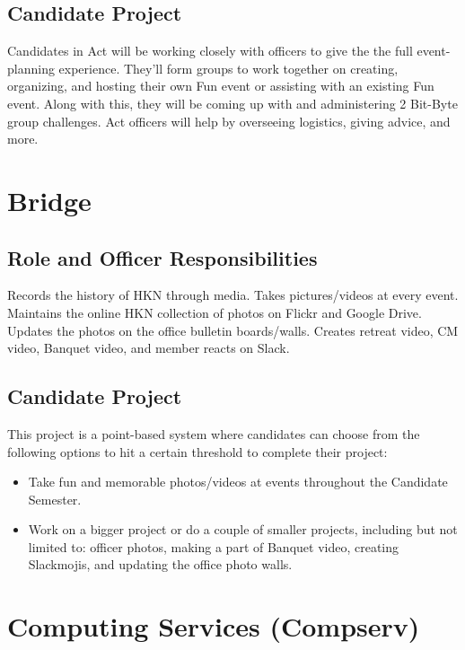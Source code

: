 \documentclass[11pt, article, oneside]{memoir}
\begin{document}
    \subsection{Candidate Project}
        Candidates in Act will be working closely with officers to give the the full event-planning experience.
        They'll form groups to work together on creating, organizing, and hosting their own Fun event or assisting with an existing Fun event.
        Along with this, they will be coming up with and administering 2 Bit-Byte group challenges.
        Act officers will help by overseeing logistics, giving advice, and more.
    
    \section{Bridge}
    \subsection{Role and Officer Responsibilities}
        Records the history of HKN through media.
        Takes pictures/videos at every event.
        Maintains the online HKN collection of photos on Flickr and Google Drive.
        Updates the photos on the office bulletin boards/walls.
        Creates retreat video, CM video, Banquet video, and member reacts on Slack.

    \subsection{Candidate Project}
        This project is a point-based system where candidates can choose from the following options to hit a certain threshold to complete their project:
        \begin{itemize}
            \item Take fun and memorable photos/videos at events throughout the Candidate Semester.
            \item Work on a bigger project or do a couple of smaller projects, including but not limited to: officer photos, making a part of Banquet video, creating Slackmojis, and updating the office photo walls.
        \end{itemize}


    \section{Computing Services (Compserv)}
\end{document}
